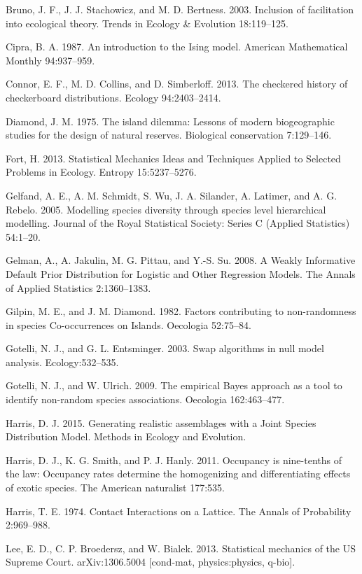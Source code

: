 \documentclass[12pt,]{article}
\begin{document}
\begin{spacing}{1.9}
\begin{flushleft}
Bruno, J. F., J. J. Stachowicz, and M. D. Bertness. 2003. Inclusion of
facilitation into ecological theory. Trends in Ecology \& Evolution
18:119--125.

Cipra, B. A. 1987. An introduction to the Ising model. American
Mathematical Monthly 94:937--959.

Connor, E. F., M. D. Collins, and D. Simberloff. 2013. The checkered
history of checkerboard distributions. Ecology 94:2403--2414.

Diamond, J. M. 1975. The island dilemma: Lessons of modern biogeographic
studies for the design of natural reserves. Biological conservation
7:129--146.

Fort, H. 2013. Statistical Mechanics Ideas and Techniques Applied to
Selected Problems in Ecology. Entropy 15:5237--5276.

Gelfand, A. E., A. M. Schmidt, S. Wu, J. A. Silander, A. Latimer, and A.
G. Rebelo. 2005. Modelling species diversity through species level
hierarchical modelling. Journal of the Royal Statistical Society: Series
C (Applied Statistics) 54:1--20.

Gelman, A., A. Jakulin, M. G. Pittau, and Y.-S. Su. 2008. A Weakly
Informative Default Prior Distribution for Logistic and Other Regression
Models. The Annals of Applied Statistics 2:1360--1383.

Gilpin, M. E., and J. M. Diamond. 1982. Factors contributing to
non-randomness in species Co-occurrences on Islands. Oecologia
52:75--84.

Gotelli, N. J., and G. L. Entsminger. 2003. Swap algorithms in null
model analysis. Ecology:532--535.

Gotelli, N. J., and W. Ulrich. 2009. The empirical Bayes approach as a
tool to identify non-random species associations. Oecologia
162:463--477.

Harris, D. J. 2015. Generating realistic assemblages with a Joint
Species Distribution Model. Methods in Ecology and Evolution.

Harris, D. J., K. G. Smith, and P. J. Hanly. 2011. Occupancy is
nine-tenths of the law: Occupancy rates determine the homogenizing and
differentiating effects of exotic species. The American naturalist
177:535.

Harris, T. E. 1974. Contact Interactions on a Lattice. The Annals of
Probability 2:969--988.

Lee, E. D., C. P. Broedersz, and W. Bialek. 2013. Statistical mechanics
of the US Supreme Court. arXiv:1306.5004 {[}cond-mat, physics:physics,
q-bio{]}.


\end{flushleft}
\end{spacing}
\end{document}

